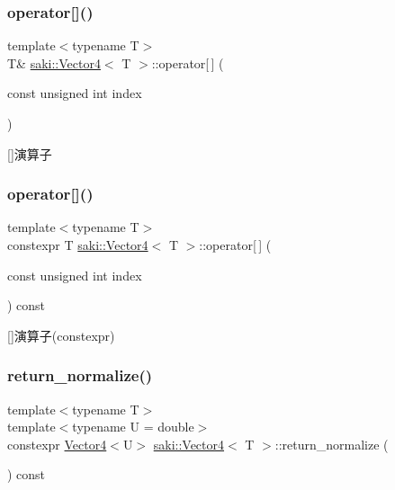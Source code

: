 \subsubsection{\texorpdfstring{operator[]()}{operator[]()}\hspace{0.1cm}{\footnotesize\ttfamily [1/2]}}
{\footnotesize\ttfamily template$<$typename T$>$ \\
T\& \mbox{\hyperlink{classsaki_1_1_vector4}{saki\+::\+Vector4}}$<$ T $>$\+::operator\mbox{[}$\,$\mbox{]} (\begin{DoxyParamCaption}\item[{const unsigned int}]{index }\end{DoxyParamCaption})\hspace{0.3cm}{\ttfamily [inline]}}



\mbox{[}\mbox{]}演算子 

\mbox{\label{classsaki_1_1_vector4_a180cd57b2ec16f404857c7f892e02bac}} 
\subsubsection{\texorpdfstring{operator[]()}{operator[]()}\hspace{0.1cm}{\footnotesize\ttfamily [2/2]}}
{\footnotesize\ttfamily template$<$typename T$>$ \\
constexpr T \mbox{\hyperlink{classsaki_1_1_vector4}{saki\+::\+Vector4}}$<$ T $>$\+::operator\mbox{[}$\,$\mbox{]} (\begin{DoxyParamCaption}\item[{const unsigned int}]{index }\end{DoxyParamCaption}) const\hspace{0.3cm}{\ttfamily [inline]}}



\mbox{[}\mbox{]}演算子(constexpr) 

\mbox{\label{classsaki_1_1_vector4_a1d02e0290384d777fe51b8d89f175f78}} 
\subsubsection{\texorpdfstring{return\+\_\+normalize()}{return\_normalize()}}
{\footnotesize\ttfamily template$<$typename T$>$ \\
template$<$typename U  = double$>$ \\
constexpr \mbox{\hyperlink{classsaki_1_1_vector4}{Vector4}}$<$U$>$ \mbox{\hyperlink{classsaki_1_1_vector4}{saki\+::\+Vector4}}$<$ T $>$\+::return\+\_\+normalize (\begin{DoxyParamCaption}{ }\end{DoxyParamCaption}) const\hspace{0.3cm}{\ttfamily [inline]}}




